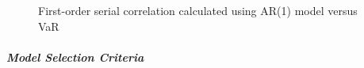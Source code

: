\documentclass[11pt]{article}
\begin{document}
\begin{figure}[H]
\begin{minipage}[b]{0.48\textwidth}
    \caption{First-order serial correlation calculated using AR(1) model versus VaR}
    \label{fig:SerCol-VaR5yrAR1}
  \end{minipage}
\end{figure}


\subparagraph{Model Selection Criteria}




\newpage







\clearpage
\end{document}
